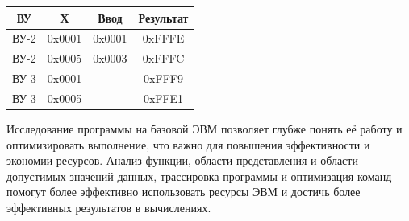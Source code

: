 \documentclass[14pt]{extreport}
\begin{document}
        \bigskip
        \begin{tabular}{|c|c|c|c|}
            \hline
            ВУ & X & Ввод & Результат \\
            \hline
            ВУ-2 & 0x0001 & 0x0001 & 0xFFFE \\
            ВУ-2 & 0x0005 & 0x0003 & 0xFFFC \\
            ВУ-3 & 0x0001 && 0xFFF9 \\
            ВУ-3 & 0x0005 && 0xFFE1 \\

            \hline
        \end{tabular}

    \conclusions Исследование программы на базовой ЭВМ позволяет глубже понять её работу и оптимизировать выполнение, что важно для повышения эффективности и экономии ресурсов. Анализ функции, области представления и области допустимых значений данных, трассировка программы и оптимизация команд помогут более эффективно использовать ресурсы ЭВМ и достичь более эффективных результатов в вычислениях.
\end{document}
